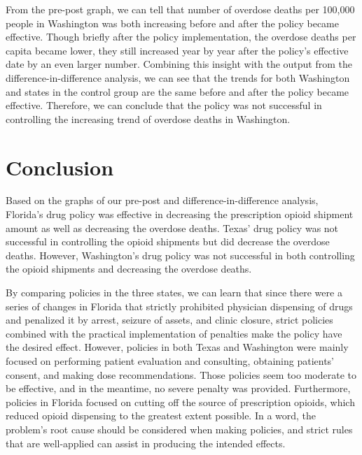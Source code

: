 \documentclass[12pt,letterpaper]{article}
\begin{document}
From the pre-post graph, we can tell that number of overdose deaths per 100,000 people in Washington was both increasing before and after the policy became effective. Though briefly after the policy implementation, the overdose deaths per capita became lower, they still increased year by year after the policy's effective date by an even larger number. Combining this insight with the output from the difference-in-difference analysis, we can see that the trends for both Washington and states in the control group are the same before and after the policy became effective. Therefore, we can conclude that the policy was not successful in controlling the increasing trend of overdose deaths in Washington.


\section{Conclusion}

Based on the graphs of our pre-post and difference-in-difference analysis, Florida's drug policy was effective in decreasing the prescription opioid shipment amount as well as decreasing the overdose deaths. Texas' drug policy was not successful in controlling the opioid shipments but did decrease the overdose deaths. However, Washington's drug policy was not successful in both controlling the opioid shipments and decreasing the overdose deaths.



By comparing policies in the three states, we can learn that since there were a series of changes in Florida that strictly prohibited physician dispensing of drugs and penalized it by arrest, seizure of assets, and clinic closure, strict policies combined with the practical implementation of penalties make the policy have the desired effect. However, policies in both Texas and Washington were mainly focused on performing patient evaluation and consulting, obtaining patients' consent, and making dose recommendations. Those policies seem too moderate to be effective, and in the meantime, no severe penalty was provided. Furthermore, policies in Florida focused on cutting off the source of prescription opioids, which reduced opioid dispensing to the greatest extent possible. In a word, the problem's root cause should be considered when making policies, and strict rules that are well-applied can assist in producing the intended effects.
\end{document}
